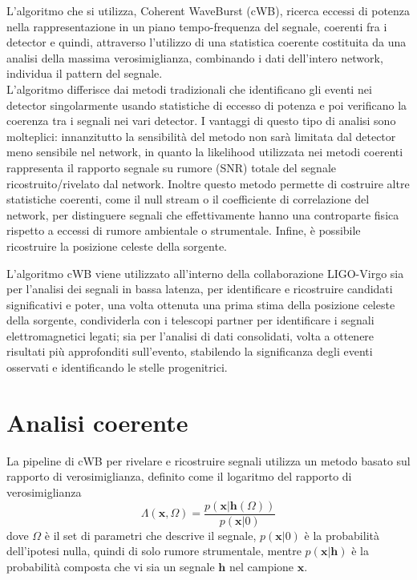 L'algoritmo che si utilizza, Coherent WaveBurst (cWB), ricerca eccessi di potenza nella rappresentazione in un piano tempo-frequenza del segnale, coerenti fra i detector e quindi, attraverso l'utilizzo di una statistica coerente costituita da una analisi della massima verosimiglianza, combinando i dati dell'intero network, individua il pattern del segnale.\\
L'algoritmo differisce dai metodi tradizionali che identificano gli eventi nei detector singolarmente usando statistiche di eccesso di potenza e poi verificano la coerenza tra i segnali nei vari detector.
I vantaggi di questo tipo di analisi sono molteplici: innanzitutto la sensibilità del metodo non sarà limitata dal detector meno sensibile nel network, in quanto la likelihood utilizzata nei metodi coerenti rappresenta il rapporto segnale su rumore (SNR) totale del segnale ricostruito/rivelato dal network. 
Inoltre questo metodo permette di costruire altre statistiche coerenti, come il null stream o il coefficiente di correlazione  del network, per distinguere segnali che effettivamente hanno una controparte fisica rispetto a eccessi di rumore ambientale o strumentale. Infine, è possibile ricostruire la posizione celeste della sorgente\cite{Klimenko_2008}.

L'algoritmo cWB viene utilizzato all'interno della collaborazione LIGO-Virgo sia per l'analisi dei segnali in bassa latenza, per identificare e ricostruire candidati significativi e poter, una volta ottenuta una prima stima della posizione celeste della sorgente, condividerla con i telescopi partner per identificare i segnali elettromagnetici legati; sia per l'analisi di dati consolidati, volta a ottenere risultati più approfonditi sull'evento, stabilendo la significanza degli eventi osservati e identificando le stelle progenitrici\cite{Klimenko_2016}.
\section{Analisi coerente}
\label{section:coherent_analysis}
La pipeline di cWB per rivelare e ricostruire segnali utilizza un metodo basato sul rapporto di verosimiglianza, definito come il logaritmo del rapporto di verosimiglianza
\begin{equation}
	\Lambda(\mathbf{x},\Omega) = \frac{p(\mathbf{x}|\mathbf{h}(\Omega))}{p(\mathbf{x}|0)}
\end{equation}
dove $\Omega$ è il set di parametri che descrive il segnale, $p(\mathbf{x}|0)$ è la probabilità dell'ipotesi nulla, quindi di solo rumore strumentale, mentre $p(\mathbf{x}|\mathbf{h})$ è la probabilità composta che vi sia un segnale $\mathbf{h}$ nel campione $\mathbf{x}$\cite{Klimenko_2016}.


